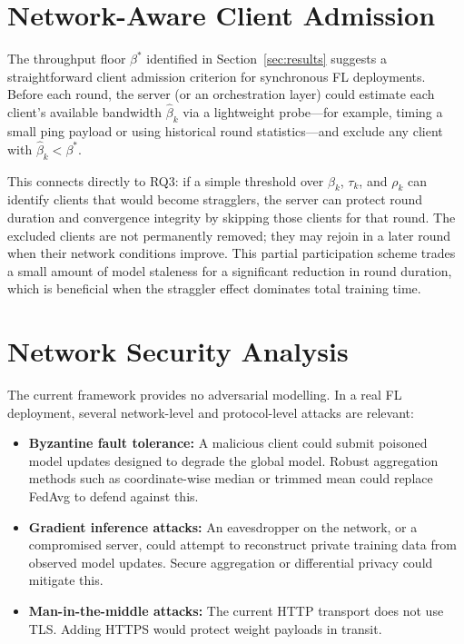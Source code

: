 \documentclass[12pt,a4paper]{report}
\begin{document}
\section{Network-Aware Client Admission}
\label{sec:future}

The throughput floor $\beta^*$ identified in Section~\ref{sec:results}
suggests a straightforward client admission criterion for synchronous FL
deployments.  Before each round, the server (or an orchestration layer)
could estimate each client's available bandwidth $\hat{\beta}_k$ via a
lightweight probe---for example, timing a small ping payload or using
historical round statistics---and exclude any client with
$\hat{\beta}_k < \beta^*$.

This connects directly to RQ3: if a simple threshold over $\beta_k$,
$\tau_k$, and $\rho_k$ can identify clients that would become stragglers,
the server can protect round duration and convergence integrity by
skipping those clients for that round.  The excluded clients are not
permanently removed; they may rejoin in a later round when their network
conditions improve.  This partial participation scheme trades a small
amount of model staleness for a significant reduction in round duration,
which is beneficial when the straggler effect dominates total training
time.

\section{Network Security Analysis}

The current framework provides no adversarial modelling.  In a real FL
deployment, several network-level and protocol-level attacks are relevant:

\begin{itemize}
  \item \textbf{Byzantine fault tolerance:} A malicious client could
        submit poisoned model updates designed to degrade the global
        model.  Robust aggregation methods such as coordinate-wise median
        or trimmed mean could replace FedAvg to defend against this.
  \item \textbf{Gradient inference attacks:} An eavesdropper on the
        network, or a compromised server, could attempt to reconstruct
        private training data from observed model updates.  Secure
        aggregation or differential privacy could mitigate this.
  \item \textbf{Man-in-the-middle attacks:} The current HTTP transport
        does not use TLS.  Adding HTTPS would protect weight payloads
        in transit.
\end{itemize}
\end{document}
